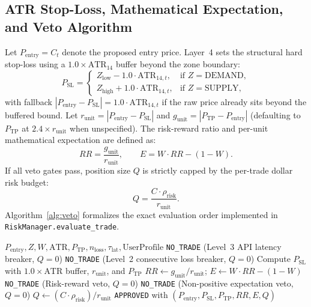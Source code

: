 \documentclass[conference]{IEEEtran}
\begin{document}
\subsection{ATR Stop-Loss, Mathematical Expectation, and Veto Algorithm}
Let $P_{\text{entry}} = C_t$ denote the proposed entry price. Layer~4 sets the structural hard stop-loss using a $1.0 \times \text{ATR}_{14}$ buffer beyond the zone boundary:
\begin{equation}
P_{\text{SL}} =
\begin{cases}
Z_{\text{low}} - 1.0 \cdot \text{ATR}_{14,t}, & \text{if } Z = \text{DEMAND}, \\
Z_{\text{high}} + 1.0 \cdot \text{ATR}_{14,t}, & \text{if } Z = \text{SUPPLY},
\end{cases}
\end{equation}
with fallback $|P_{\text{entry}} - P_{\text{SL}}| = 1.0 \cdot \text{ATR}_{14,t}$ if the raw price already sits beyond the buffered bound. Let $r_{\text{unit}} = |P_{\text{entry}} - P_{\text{SL}}|$ and $g_{\text{unit}} = |P_{\text{TP}} - P_{\text{entry}}|$ (defaulting to $P_{\text{TP}}$ at $2.4 \times r_{\text{unit}}$ when unspecified). The risk-reward ratio and per-unit mathematical expectation are defined as:
\begin{equation}
RR = \frac{g_{\text{unit}}}{r_{\text{unit}}}, \qquad
E = W \cdot RR - (1 - W).
\end{equation}
If all veto gates pass, position size $Q$ is strictly capped by the per-trade dollar risk budget:
\begin{equation}
Q = \frac{C \cdot \rho_{\text{risk}}}{r_{\text{unit}}}.
\end{equation}
Algorithm~\ref{alg:veto} formalizes the exact evaluation order implemented in \texttt{RiskManager.evaluate\_trade}.

\begin{algorithm}[t]
\caption{Layer~4 Veto Risk Gate (\texttt{RiskManager.evaluate\_trade})}
\label{alg:veto}
\begin{algorithmic}[1]
\REQUIRE $P_{\text{entry}}, Z, W, \text{ATR}, P_{\text{TP}}, n_{\text{loss}}, \tau_{\text{lat}}, \text{UserProfile}$
    \RETURN \texttt{NO\_TRADE} (Level~3 API latency breaker, $Q=0$)
\ENDIF
{}
    \RETURN \texttt{NO\_TRADE} (Level~2 consecutive loss breaker, $Q=0$)
\ENDIF
\STATE Compute $P_{\text{SL}}$ with $1.0 \times \text{ATR}$ buffer, $r_{\text{unit}}$, and $P_{\text{TP}}$
\STATE $RR \leftarrow g_{\text{unit}} / r_{\text{unit}}$; \quad $E \leftarrow W \cdot RR - (1 - W)$
    \RETURN \texttt{NO\_TRADE} (Risk-reward veto, $Q=0$)
\ENDIF
{}
    \RETURN \texttt{NO\_TRADE} (Non-positive expectation veto, $Q=0$)
\ENDIF
\STATE $Q \leftarrow (C \cdot \rho_{\text{risk}}) / r_{\text{unit}}$
\RETURN \texttt{APPROVED} with $(P_{\text{entry}}, P_{\text{SL}}, P_{\text{TP}}, RR, E, Q)$
\end{algorithmic}
\end{algorithm}
\end{document}
